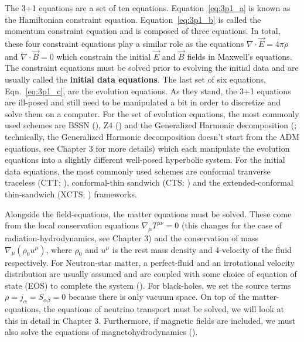The 3+1 equations are a set of ten equations. Equation~\ref{eq:3p1_a} is known as the Hamiltonian constraint equation. Equation~\ref{eq:3p1_b} is called the momentum constraint equation and is composed of three equations. In total, these four constraint equations play a similar role as the equations $\nabla \cdot \vec E = 4\pi\rho$ and $\nabla \cdot \vec B = 0$ which constrain the initial $\vec E$ and $\vec B$ fields in Maxwell's equations. The constraint equations must be solved prior to evolving the initial data and are usually called the \textbf{initial data equations}. The last set of six equations, Eqn.~\ref{eq:3p1_c}, are the evolution equations. As they stand, the 3+1 equations are ill-posed and still need to be manipulated a bit in order to discretize and solve them on a computer. For the set of evolution equations, the most commonly used schemes are BSSN (\citet*{baumgarte1998numerical,shibata1995evolution}), Z4 (\citet*{bona2003general}) and the Generalized Harmonic decomposition (\citet*{pretorius2005numerical}; technically, the Generalized Harmonic decomposition doesn't start from the ADM equations, see Chapter 3 for more details) which each manipulate the evolution equations into a slightly different well-posed hyperbolic system. For the initial data equations, the most commonly used schemes are conformal tranverse traceless (CTT; \citet*{bowen1980time}), conformal-thin sandwich (CTS; \citet*{york1999conformal}) and the extended-conformal thin-sandwich (XCTS; \citet*{pfeiffer-york:2005}) frameworks.

Alongside the field-equations, the matter equations must be solved. These come from the local conservation equations $\nabla_{\mu}T^{\mu\nu} = 0$ (this changes for the case of radiation-hydrodynamics, see Chapter 3) and the conservation of mass $\nabla_\mu(\rho_0 u^\mu)$, where $\rho_0$ and $u^\mu$ is the rest mass density and 4-velocity of the fluid respectively. For Neutron-star matter, a perfect-fluid and an irrotational velocity distribution are usually assumed and are coupled with some choice of equation of state (EOS) to complete the system (\citet*{faber2012binary}). For black-holes, we set the source terms $\rho = j_{\alpha} = S_{\alpha\beta} = 0$ because there is only vacuum space. On top of the matter-equations, the equations of neutrino transport must be solved, we will look at this in detail in Chapter 3. Furthermore, if magnetic fields are included, we must also solve the equations of magnetohydrodynamics (\citet*{baumgarte2003general,shibata2012radiation}).

